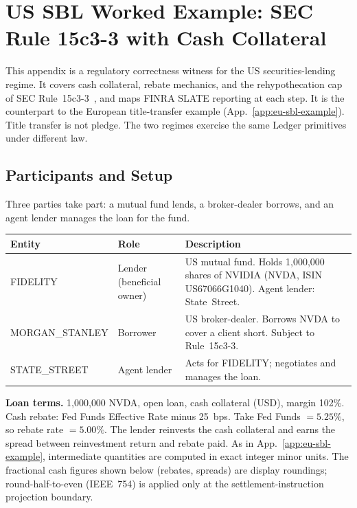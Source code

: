 \section{US SBL Worked Example: SEC Rule 15c3-3 with Cash Collateral}
\label{app:us-sbl-example}

This appendix is a regulatory correctness witness for the US securities-lending regime. It covers cash collateral, rebate mechanics, and the rehypothecation cap of SEC Rule~15c3-3~\cite{sec15c33}, and maps FINRA SLATE reporting at each step. It is the counterpart to the European title-transfer example (App.~\ref{app:eu-sbl-example}). Title transfer is not pledge. The two regimes exercise the same Ledger primitives under different law.

\subsection{Participants and Setup}

Three parties take part: a mutual fund lends, a broker-dealer borrows, and an agent lender manages the loan for the fund.

\begin{center}\small
\begin{tabular}{l l p{7.5cm}}
\toprule
\textbf{Entity} & \textbf{Role} & \textbf{Description} \\
\midrule
FIDELITY & Lender (beneficial owner) & US mutual fund. Holds 1{,}000{,}000 shares of NVIDIA (NVDA, ISIN US67066G1040). Agent lender: State~Street. \\
MORGAN\_STANLEY & Borrower & US broker-dealer. Borrows NVDA to cover a client short. Subject to Rule~15c3-3. \\
STATE\_STREET & Agent lender & Acts for FIDELITY; negotiates and manages the loan. \\
\bottomrule
\end{tabular}
\end{center}

\noindent\textbf{Loan terms.} 1{,}000{,}000 NVDA, open loan, cash collateral (USD), margin 102\%. Cash rebate: Fed Funds Effective Rate minus 25~bps. Take Fed Funds $= 5.25\%$, so rebate rate $= 5.00\%$. The lender reinvests the cash collateral and earns the spread between reinvestment return and rebate paid. As in App.~\ref{app:eu-sbl-example}, intermediate quantities are computed in exact integer minor units. The fractional cash figures shown below (rebates, spreads) are display roundings; round-half-to-even (IEEE~754) is applied only at the settlement-instruction projection boundary.

